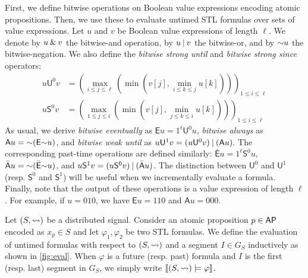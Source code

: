 \bgroup \color{red}
First, we define bitwise operations on Boolean value expressions encoding atomic propositions.
Then, we use these to evaluate untimed STL formulas over sets of value expressions.
Let $u$ and $v$ be Boolean value expressions of length $\ell$.
We denote by $u \mathbin{\&} v$ the bitwise-and operation, by $u \mathbin{|} v$ the bitwise-or, and by $\mathord{\sim} u$ the bitwise-negation.
We also define the \emph{bitwise strong until} and \emph{bitwise strong since} operators:
\begin{align*}
	u \mathsf{U}^0 v &= \left( \max_{i \leq j \leq \ell} \left( \min \left( v[j], \min_{i \leq k \leq j} u[k] \right) \right) \right)_{1 \leq i \leq \ell} \\
	u \mathsf{S}^0 v &= \left( \max_{1 \leq j \leq i} \left( \min \left( v[j], \min_{j \leq k \leq i} u[k] \right) \right) \right)_{1 \leq i \leq \ell}
\end{align*}
As usual, we derive \emph{bitwise eventually} as 
$\mathsf{E} u = 1^\ell \mathsf{U}^0 u$, \emph{bitwise always} as $\mathsf{A} u = \mathord{\sim} 
(\mathsf{E} \mathord{\sim} u)$, and \emph{bitwise weak until} as $u \mathsf{U}^1 v = (u \mathsf{U}^0 v) 
\mathbin{|} (\mathsf{A} u)$.
The corresponding past-time operations are defined similarly:
$\bar{\mathsf{E}} u = 1^\ell \mathsf{S}^0 u$,
$\bar{\mathsf{A}} u = \mathord{\sim} (\bar{\mathsf{E}} \mathord{\sim} u)$, and 
$u \mathsf{S}^1 v = (u \mathsf{S}^0 v) \mathbin{|} (\bar{\mathsf{A}} u)$.
The distinction between $\mathsf{U}^0$ and $\mathsf{U}^1$ (resp. $\mathsf{S}^0$ and $\mathsf{S}^1$) will be useful when we incrementally evaluate a formula.
Finally, note that the output of these operations is a value expression of length $\ell$.
For example, if $u = 010$, we have $\mathsf{E} u = 110$ and $\mathsf{A} u = 000$.
\egroup

Let  $(S, {\rightsquigarrow})$ be a distributed signal.
Consider an atomic proposition $p \in \mathsf{AP}$ encoded as $x_p \in S$ and let $\varphi_1, \varphi_2$ be two STL formulas.
We define the evaluation of untimed formulas with respect to $(S, {\rightsquigarrow})$ and a segment $I \in G_S$ inductively as shown in \cref{fig:eval}.
When $\varphi$ is a future (resp. past) formula and $I$ is the first (resp. last) segment in $G_S$, we simply write $\llbracket (S, {\rightsquigarrow}) \models \varphi \rrbracket$.


